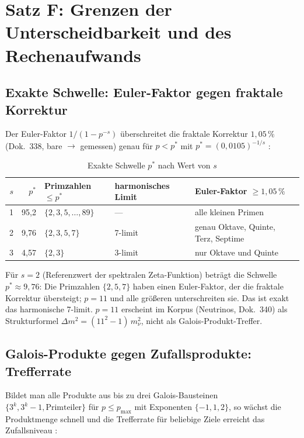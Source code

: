 \section{Satz F: Grenzen der Unterscheidbarkeit und des Rechenaufwands}

\subsection{Exakte Schwelle: Euler-Faktor gegen fraktale Korrektur}

Der Euler-Faktor $1/(1-p^{-s})$ überschreitet die fraktale Korrektur
$1{,}05\,\%$ (Dok.~338, bare $\to$ gemessen) genau für $p < p^*$
mit $p^* = (0{,}0105)^{-1/s}$ \BM:

\begin{table}[H]
\centering
\caption{Exakte Schwelle $p^*$ nach Wert von $s$}
\begin{tabular}{rrlll}
\toprule
$s$ & $p^*$ & Primzahlen $\leq p^*$ & harmonisches Limit & Euler-Faktor $\geq 1{,}05\,\%$ \\
\midrule
1 & 95{,}2 & $\{2,3,5,\ldots,89\}$ & --- & alle kleinen Primen \\
2 & 9{,}76 & $\{2, 3, 5, 7\}$ & 7-limit & genau Oktave, Quinte, Terz, Septime \\
3 & 4{,}57 & $\{2, 3\}$ & 3-limit & nur Oktave und Quinte \\
\bottomrule
\end{tabular}
\end{table}

Für $s = 2$ (Referenzwert der spektralen Zeta-Funktion) beträgt die Schwelle
$p^* \approx 9{,}76$: Die Primzahlen $\{2, 5, 7\}$ haben einen Euler-Faktor,
der die fraktale Korrektur übersteigt; $p = 11$ und alle größeren
unterschreiten sie. Das ist exakt das harmonische 7-limit.
$p = 11$ erscheint im Korpus (Neutrinos, Dok.~340) als Strukturformel
$\Delta m^2 = (11^2-1)\,m_\nu^2$, nicht als Galois-Produkt-Treffer.

\subsection{Galois-Produkte gegen Zufallsprodukte: Trefferrate}

Bildet man alle Produkte aus bis zu drei Galois-Bausteinen
$\{3^k, 3^k-1, \text{Primteiler}\}$ für $p \leq p_\mathrm{max}$ mit Exponenten
$\{-1, 1, 2\}$, so wächst die Produktmenge schnell und die Trefferrate
für beliebige Ziele erreicht das Zufallsniveau \BM:

